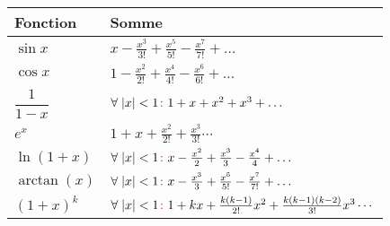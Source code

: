 \documentclass{report}
\begin{document}
\begin{multicols*}{3}
  \begin{table}[H]
    \begin{center}
      \renewcommand{\arraystretch}{2}
      \selectfont
      \footnotesize
      \begin{tabular}{l|p{3.75cm}}
          \arrayrulecolor{blue}\hline
          \rowcolor{lightBlue}
          \textcolor{myb}{Fonction} & \textcolor{myb}{Somme}
          \\
          \hline
          \arrayrulecolor{black}
          $\sin x$ & $x - \frac{x^3}{3!} +  \frac{x^5}{5!} 
          -  \frac{x^7}{7!} + \dots $ 
          \\
          \hline
          $\cos x$ & $1 - \frac{x^2}{2!} +  \frac{x^4}{4!} 
          -  \frac{x^6}{6!} + \dots $ 
          \\
          \hline
          $\dfrac{1}{1-x}$ & $\forall \; |x| <1 \textcolor{red}{\colon}  
          1 + x + x^2 + x^3 + \dots $  
          \\
          \hline 
          $e^x$ & $1 + x + \frac{x^2}{2!} + \frac{x^3}{3!} \cdots$ 
          \\
          \hline
          $\ln(1 + x)$ & $\forall \; |x| < 1 \textcolor{red}{\colon} 
          x - \frac{x^2}{2} +  \frac{x^3}{3} 
          -  \frac{x^4}{4} + \dots $ 
          \\
          \hline
          $\arctan (x)$ & $\forall \; |x| < 1 \textcolor{red}{\colon}  
          x - \frac{x^3}{3} +  \frac{x^5}{5!} 
          -  \frac{x^7}{7!} + \dots $ 
          \\
          \hline
          $(1 + x)^k$ &           
              $\forall \; |x| < 1 \textcolor{red}{\colon}  
              1+ kx + \frac{k(k-1)}{2!}x^2 
                    + \frac{k(k-1)(k-2)}{3!}x^3 
              \cdots$
          \\
          \hline

          \end{tabular}
  \end{center}
  \end{table}


\end{multicols*}
\end{document}
